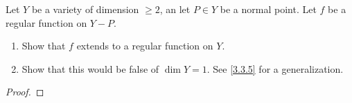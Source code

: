 \label{1.3.20}

Let $Y$ be a variety of dimension $\geq 2$, an let $P \in Y$ be a normal point. Let $f$ be a regular function on $Y - P$.

\begin{enumerate}[label = (\alph*)]
    \item Show that $f$ extends to a regular function on $Y$.

    \item Show that this would be false of $\dim Y = 1$. See \ref{3.3.5} for a generalization.
\end{enumerate}

\begin{proof}

\end{proof}
